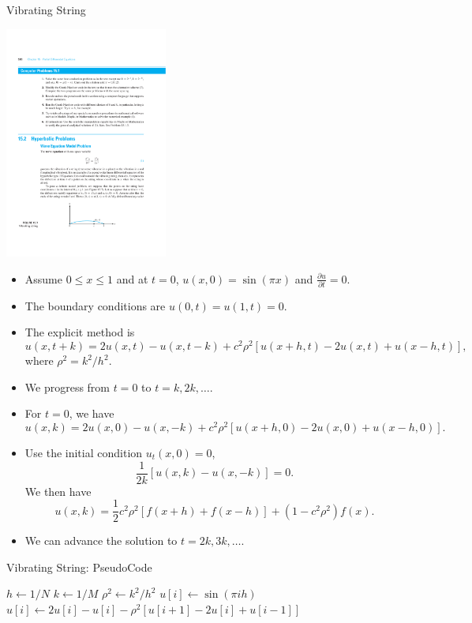 \documentclass{beamer}
\newcommand{\beforeverb}{\footnotesize}
\newcommand{\afterverb}{\normalsize}
\begin{document}
\begin{frame}{Vibrating String}
\centerline{\includegraphics[width=0.4\textwidth]{VibratingString.pdf}}
\begin{itemize}
    \item Assume $0\le x \le 1$ and at $t=0$, $u(x,0)=\sin(\pi x)$ and $\frac{\partial u}{\partial t}=0$.
    \item The boundary conditions are $u(0,t)=u(1,t)=0$.
    \item The explicit method is
    \[
    u(x, t+k)=2 u(x, t)-u(x, t-k)+c^2 \rho^2[u(x+h, t)-2 u(x, t)+u(x-h, t)],
    \]
    where $\rho^2=k^2/h^2$.
    \item We progress from $t=0$ to $t=k, 2k, \ldots$.
\end{itemize}
\end{frame}
\begin{frame}
\begin{itemize}
    \item For $t=0$, we have
    \beforeverb
    \[
        u(x, k)=2 u(x, 0)-u(x, -k)+c^2 \rho^2[u(x+h, 0)-2 u(x, 0)+u(x-h, 0)].
    \]
    \afterverb
    \item Use the initial condition $u_t(x,0)=0$,
    \[
    \frac{1}{2k}\left[u(x,k)-u(x,-k)\right]=0.
    \]
    We then have 
    \[
    u(x, k)=\frac{1}{2}c^2 \rho^2[f(x+h)+f(x-h)]+(1-c^2\rho^2) f(x).
    \]
    \item We can advance the solution to $t=2k, 3k, \ldots$.
\end{itemize}
\end{frame}
\begin{frame}{Vibrating String: PseudoCode}
\begin{algorithmic}
    \State $h \gets 1/N$
    \State $k \gets 1/M$
    \State $\rho^2 \gets k^2/h^2$
    \State $u[i] \gets \sin(\pi i h)$
    \EndFor
    \State $u[i] \gets 2 u[i]-u[i]-\rho^2[u[i+1]-2 u[i]+u[i-1]]$
    \EndFor
    \EndFor
    \EndProcedure
\end{algorithmic}

\end{frame}
\end{document}

